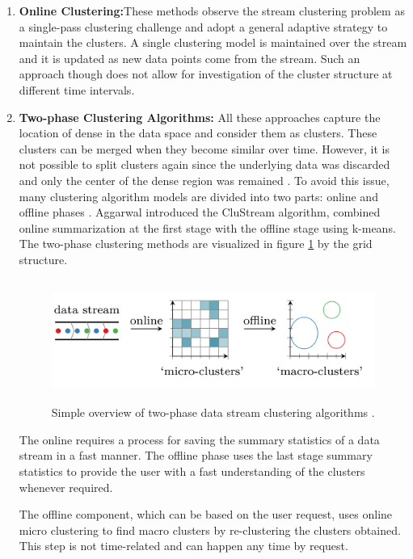 \documentclass[../UNBThesis2.tex]{subfiles}
\begin{document}
\begin{enumerate}
    \item\textbf{Online Clustering:}These methods observe the stream clustering problem as a single-pass clustering challenge and adopt a general adaptive strategy to maintain the clusters. A single clustering model is maintained over the stream and it is updated as new data points come from the stream. Such an approach though does not allow for investigation of the cluster structure at different time intervals.
    \item\textbf{Two-phase Clustering Algorithms:}
All these approaches capture the location of dense in the data space and consider them as clusters. These clusters can be merged when they become similar over time. However, it is not possible to split clusters again since the underlying data was discarded and only the center of the dense region was remained \cite{aggarwal2007data}. To avoid this issue, many clustering algorithm models are divided into two parts: online and offline phases \cite{aggarwal2003framework}. Aggarwal introduced the CluStream algorithm, combined online summarization at the first stage with the offline stage using k-means. The two-phase clustering methods are visualized in figure \ref{2phase} by the grid structure.

\begin{figure}
\centering
\includegraphics[width = 15cm,height = 4cm]{image/Chapters/Chapter2/2phase.png}
\caption{Simple overview of two-phase data stream clustering algorithms \protect\cite{carnein2019optimizing}.}
\label{2phase}
\end{figure}

The online requires a process for saving the summary statistics of a data stream in a fast manner. The offline phase uses the last stage summary statistics to provide the user with a fast understanding of the clusters whenever required. 

The offline component, which can be based on the user request, uses online micro clustering to find macro clusters by re-clustering the clusters obtained. This step is not time-related and can happen any time by request.


\end{enumerate}
\end{document}
